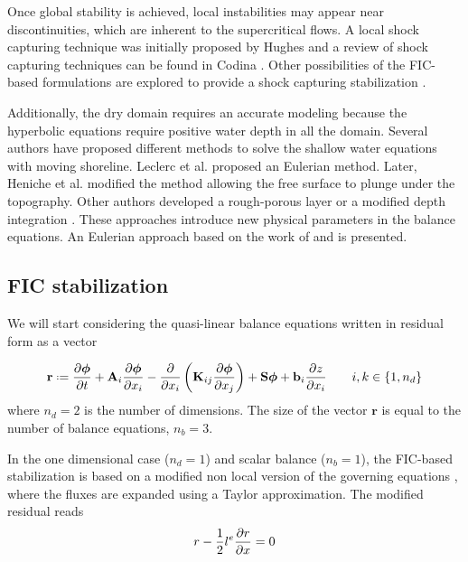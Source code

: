 Once global stability is achieved, local instabilities may appear near discontinuities, which are inherent to the supercritical flows.
A local shock capturing technique was initially proposed by Hughes \cite{hughes1986iv} and a review of shock capturing techniques can be found in Codina \cite{codina2011}.
Other possibilities of the FIC-based formulations are explored to provide a shock capturing stabilization \cite{cotela2016}.

Additionally, the dry domain requires an accurate modeling because the hyperbolic equations require positive water depth in all the domain.
Several authors have proposed different methods to solve the shallow water equations with moving shoreline. Leclerc et al. \cite{leclerc1990} proposed an Eulerian method. Later, Heniche et al. \cite{heniche2000} modified the method allowing the free surface to plunge under the topography.
Other authors developed a rough-porous layer \cite{candy2017,barros2011} or a modified depth integration \cite{defina2000}. These approaches introduce new physical parameters in the balance equations.
An Eulerian approach based on the work of \cite{leclerc1990} and \cite{heniche2000} is presented.




\subsection{FIC stabilization}
\label{sec:stabilization}

We will start considering the quasi-linear balance equations written in residual form as a vector

\begin{equation} \label{residual}
\mathbf{r} \defeq 
  \pder{\bm{\phi}}{t} + \mathbf{A}_i\pder{\bm{\phi}}{x_i}
  -\pder{}{x_i}\left(\mathbf{K}_{ij}\pder{\bm{\phi}}{x_j}\right) + \mathbf{S}\bm{\phi} + \mathbf{b}_i\pder{z}{x_i} \qquad i,k\in\{1,n_d\}
\end{equation}
where $n_d=2$ is the number of dimensions. The size of the vector $\mathbf{r}$ is equal to the number of balance equations, $n_b=3$.

In the one dimensional case ($n_d=1$) and scalar balance ($n_b=1$), the FIC-based stabilization is based on a modified non local version of the governing equations \cite{onate1998}, where the fluxes are expanded using a Taylor approximation. The modified residual reads
\begin{equation}
r - \frac{1}{2}l^e\frac{\partial r}{\partial x} = 0
\end{equation}

